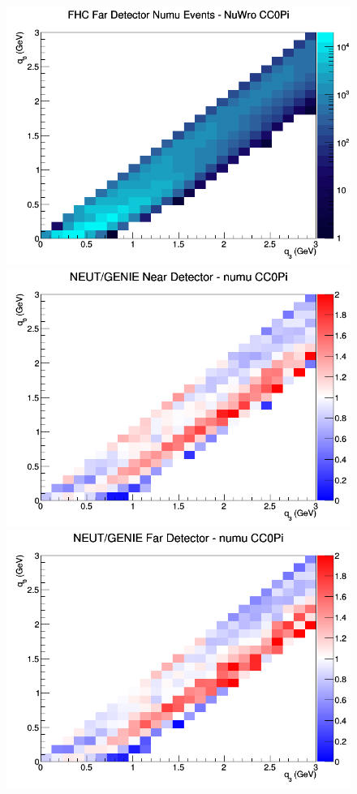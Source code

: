\begin{figure}[h]
\endminipage
{}
\includegraphics[width=\linewidth]{q0_q3/nominal/CC0Pi_FHC_FD_numu_q3_q0_NuWro.png}
\endminipage
\newline
{}
\includegraphics[width=\linewidth]{q0_q3/nominal/ratios/CC0Pi_NEUT_GENIE_numu_near_q3_q0.png}
\endminipage
{}
\includegraphics[width=\linewidth]{q0_q3/nominal/ratios/CC0Pi_NEUT_GENIE_numu_far_q3_q0.png}

\end{figure}
